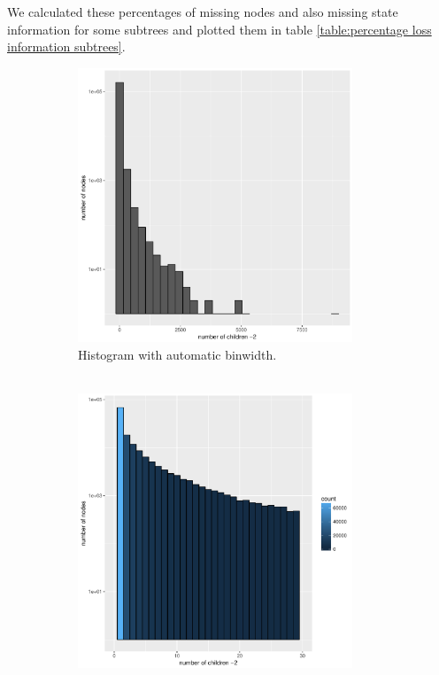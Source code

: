     We calculated these percentages of missing nodes and also missing state information for some 
      subtrees and plotted them in table \ref{table:percentage loss information subtrees}.

    \begin{figure}[h!]
      \centering
      \begin{subfigure}[b]{0.59\textwidth}
        \includegraphics[width=0.9\textwidth]{Figures/multifurc.pdf}
        \caption{Histogram with automatic binwidth. \\ ~}
      \end{subfigure}
      \begin{subfigure}[b]{0.4\textwidth}
        \includegraphics[trim = 0mm 0mm 30mm 0mm, clip, width=0.9\textwidth]{Figures/multifurc_small.pdf}

\end{subfigure}
\end{figure}
